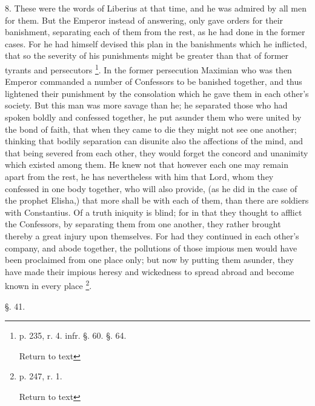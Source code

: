 8. These were the words of Liberius at that time,
and he was admired by all men for them. But the Emperor instead of
answering, only gave orders for their banishment, separating each of
them from the rest, as he had done in the former cases. For he had
himself devised this plan in the banishments which he inflicted, that
so the severity of his punishments might be greater than that of
former tyrants and persecutors \footnote{p. 235, r. 4. infr. §. 60. §. 64.

Return to text}. In
the former persecution Maximian who was then Emperor commanded a
number of Confessors to be banished together, and thus lightened their
punishment by the consolation which he gave them in each other's
society. But this man was more savage than he; he separated those who
had spoken boldly and confessed together, he put asunder them who were
united by the bond of faith, that when they came to die they might not
see one another; thinking that bodily separation can disunite also the
affections of the mind, and that being severed from each other, they
would forget the concord and unanimity which existed among them. He
knew not that however each one may remain apart from the rest, he has
nevertheless with him that Lord, whom they confessed in one body
together, who will also provide, (as he did in the case of the prophet
Elisha,) that more shall be with each of them, than there are soldiers
with Constantius. Of a truth iniquity is blind; for in that they
thought to afflict the Confessors, by separating them from one
another, they rather brought thereby a great injury upon themselves.
For had they continued in each other's company, and abode together,
the pollutions of those impious men would have been proclaimed from
one place only; but now by putting them asunder, they have made their
impious heresy and wickedness to spread abroad and become known in
every place \footnote{p. 247, r. 1.

Return to text}.

§. 41.

